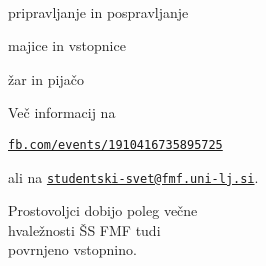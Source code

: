 \documentclass[a4paper,oneside,12pt]{article}
\title{\Title}
\author{\Author}
\date{\today}
\theoremstyle{definition}
\newenvironment{itemize*}{\vspace{-6pt}\begin{itemize}\setlength{\itemsep}{0pt}\setlength{\parskip}{2pt}}{\end{itemize}}
\begin{document}
\vspace*{-10ex}

\begin{center}
\fontsize{64}{64}\selectfont
{} \\[1ex]
\end{center}

\fontsize{48}{48}\selectfont
\vspace{-1ex}
\begin{itemize*}
  \item pripravljanje in pospravljanje
  \item majice in vstopnice
  \item žar in pijačo
\end{itemize*}

\vspace{-1ex}

\hspace{2em}

\vspace{-1.5ex}

\fontsize{24}{24}\selectfont
Več informacij na
\begin{center}
  \vspace{-3ex}
\href{https://www.facebook.com/events/1910416735895725/}{\texttt{fb.com/events/1910416735895725}}
  \vspace{-3ex}
\end{center}
ali na
\href{mailto:studentski-svet@fmf.uni-lj.si}{\tt studentski-svet@fmf.uni-lj.si}.

\vspace{-1.5ex}
\fontsize{48}{48}\selectfont
Prostovoljci dobijo poleg večne \\
hvaležnosti ŠS FMF tudi \\ povrnjeno vstopnino.
\end{document}
